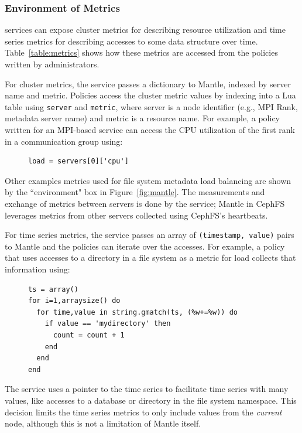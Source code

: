 \subsubsection{Environment of Metrics} services can expose cluster metrics for
describing resource utilization and time series metrics for describing accesses
to some data structure over time. Table~\ref{table:metrics} shows how these
metrics are accessed from the policies written by administrators. 

For cluster metrics, the service passes a dictionary to Mantle, indexed by
server name and metric. Policies access the cluster metric values by indexing
into a Lua table using \texttt{server} and \texttt{metric}, where server is a
node identifier ({e.g.}, MPI Rank, metadata server name) and metric is a
resource name.  For example, a policy written for an MPI-based service can
access the CPU utilization of the first rank in a communication group using:

\begin{figure}[h]
\footnotesize
\begin{verbatim}
load = servers[0]['cpu']
\end{verbatim}
\end{figure}

Other examples metrics used for file system metadata load balancing are shown
by the ``environment" box in Figure~\ref{fig:mantle}. The measurements and
exchange of metrics between servers is done by the service; Mantle in CephFS
leverages metrics from other servers collected using CephFS's heartbeats.

For time series metrics, the service passes an array of \texttt{(timestamp,
value)} pairs to Mantle and the policies can iterate over the accesses. For
example, a policy that uses accesses to a directory in a file system as a
metric for load collects that information using:

\begin{figure}[h]
\footnotesize
\begin{verbatim}
ts = array()
for i=1,arraysize() do
  for time,value in string.gmatch(ts, (%w+=%w)) do
    if value == 'mydirectory' then
      count = count + 1
    end
  end
end
\end{verbatim}
\end{figure}

The service uses a pointer to the time series to facilitate time series with
many values, like accesses to a database or directory in the file system
namespace. This decision limits the time series metrics to only include values
from the {\it current } node, although this is not a limitation of Mantle
itself.

